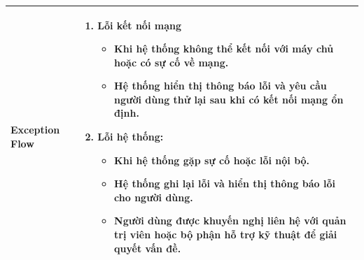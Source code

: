 \begin{longtable}[H]{|l|p{}|}
        \textbf{Exception Flow} & \vspace{-1cm} \begin{enumerate}[leftmargin=5.5mm]
            \item Lỗi kết nối mạng
                \begin{itemize}[topsep=0pt]
                    \setlength\itemsep{0em}
                    \item Khi hệ thống không thể kết nối với máy chủ hoặc có sự cố về mạng.
                    \item Hệ thống hiển thị thông báo lỗi và yêu cầu người dùng thử lại sau khi có kết nối mạng ổn định.
                \end{itemize}
            \item Lỗi hệ thống:
                \begin{itemize}[topsep=0pt]
                    \setlength\itemsep{0em}
                    \item Khi hệ thống gặp sự cố hoặc lỗi nội bộ.
                    \item Hệ thống ghi lại lỗi và hiển thị thông báo lỗi cho người dùng.
                    \item Người dùng được khuyến nghị liên hệ với quản trị viên hoặc bộ phận hỗ trợ kỹ thuật để giải quyết vấn đề.
                \end{itemize}
        \end{enumerate}\\
        \hline 
    \end{longtable}
    
